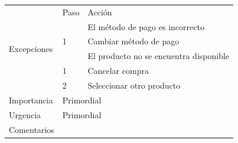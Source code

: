 \begin{table}[th!]
\begin{tabular}{|l|l|l|}
		\multirow{6}{*}{Excepciones}                                                 & Paso                                                                   & Acción                                                                                                                                                                                      \\ \cline{2-3} 
		&                                                                        & El método de pago es incorrecto                                                                                                                                                             \\ \cline{2-3} 
		& 1                                                                      & Cambiar método de pago                                                                                                                                                                      \\ \cline{2-3} 
		&                                                                        & El producto no se encuentra disponible                                                                                                                                                      \\ \cline{2-3} 
		& 1                                                                      & Cancelar compra                                                                                                                                                                             \\ \cline{2-3} 
		& 2                                                                      & Seleccionar otro producto                                                                                                                                                                   \\ \hline
		Importancia                                                                  & \multicolumn{2}{l|}{Primordial}                                                                                                                                                                                                                                      \\ \hline
		Urgencia                                                                     & \multicolumn{2}{l|}{Primordial}                                                                                                                                                                                                                                      \\ \hline
		Comentarios                                                                  & \multicolumn{2}{l|}{}                                                                                                                                                                                                                                                \\ \hline
	\end{tabular}
\end{table}
\newpage
